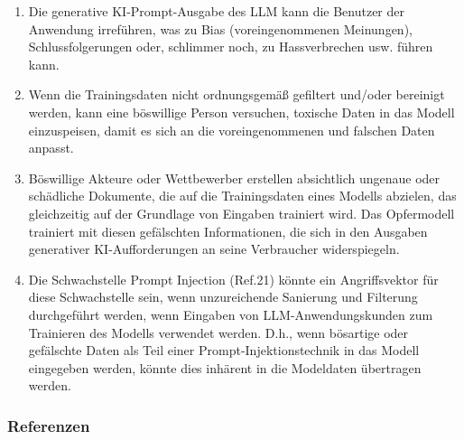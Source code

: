 \documentclass[
]{article}
\providecommand{\tightlist}{%
  \setlength{\itemsep}{0pt}\setlength{\parskip}{0pt}}
\begin{document}
\begin{enumerate}
\def\labelenumi{\arabic{enumi}.}
\tightlist
\item
  Die generative KI-Prompt-Ausgabe des LLM kann die Benutzer der
  Anwendung irreführen, was zu Bias (voreingenommenen Meinungen),
  Schlussfolgerungen oder, schlimmer noch, zu Hassverbrechen usw. führen
  kann.
\item
  Wenn die Trainingsdaten nicht ordnungsgemäß gefiltert und/oder
  bereinigt werden, kann eine böswillige Person versuchen, toxische
  Daten in das Modell einzuspeisen, damit es sich an die
  voreingenommenen und falschen Daten anpasst.
\item
  Böswillige Akteure oder Wettbewerber erstellen absichtlich ungenaue
  oder schädliche Dokumente, die auf die Trainingsdaten eines Modells
  abzielen, das gleichzeitig auf der Grundlage von Eingaben trainiert
  wird. Das Opfermodell trainiert mit diesen gefälschten Informationen,
  die sich in den Ausgaben generativer KI-Aufforderungen an seine
  Verbraucher widerspiegeln.
\item
  Die Schwachstelle Prompt Injection (Ref.21) könnte ein Angriffsvektor
  für diese Schwachstelle sein, wenn unzureichende Sanierung und
  Filterung durchgeführt werden, wenn Eingaben von LLM-Anwendungskunden
  zum Trainieren des Modells verwendet werden. D.h., wenn bösartige oder
  gefälschte Daten als Teil einer Prompt-Injektionstechnik in das Modell
  eingegeben werden, könnte dies inhärent in die Modeldaten übertragen
  werden.
\end{enumerate}

\subsubsection{Referenzen}\label{referenzen}
\end{document}
